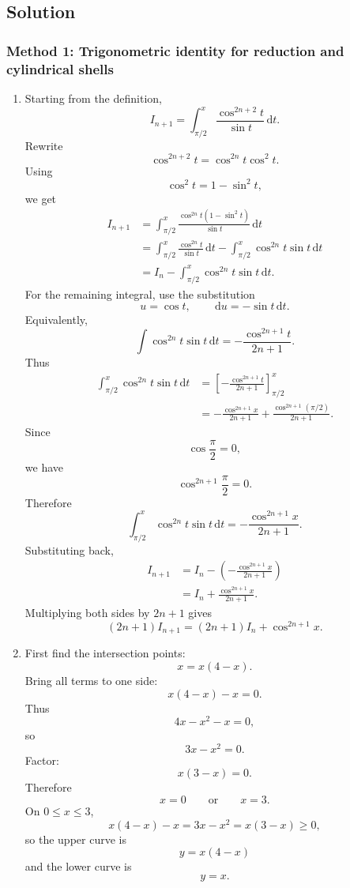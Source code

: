 \documentclass[12pt]{article}
\newcommand{\dd}{\,\mathrm{d}}
\begin{document}
\newpage
\subsection{Solution}

\subsubsection{Method 1: Trigonometric identity for reduction and cylindrical shells}

\begin{enumerate}[label=(\alph*)]
\item Starting from the definition,
\[
I_{n+1}
=
\int_{\pi/2}^x \frac{\cos^{2n+2}t}{\sin t}\dd t.
\]
Rewrite
\[
\cos^{2n+2}t=\cos^{2n}t\cos^2t.
\]
Using
\[
\cos^2t=1-\sin^2t,
\]
we get
\begin{align*}
I_{n+1}
&=
\int_{\pi/2}^x
\frac{\cos^{2n}t(1-\sin^2t)}{\sin t}\dd t\\
&=
\int_{\pi/2}^x
\frac{\cos^{2n}t}{\sin t}\dd t
-
\int_{\pi/2}^x
\cos^{2n}t\sin t\dd t\\
&=
I_n
-
\int_{\pi/2}^x
\cos^{2n}t\sin t\dd t.
\end{align*}
For the remaining integral, use the substitution
\[
u=\cos t,
\qquad
\dd u=-\sin t\dd t.
\]
Equivalently,
\[
\int \cos^{2n}t\sin t\dd t
=
-\frac{\cos^{2n+1}t}{2n+1}.
\]
Thus
\begin{align*}
\int_{\pi/2}^x
\cos^{2n}t\sin t\dd t
&=
\left[-\frac{\cos^{2n+1}t}{2n+1}\right]_{\pi/2}^{x}\\
&=
-\frac{\cos^{2n+1}x}{2n+1}
+
\frac{\cos^{2n+1}(\pi/2)}{2n+1}.
\end{align*}
Since
\[
\cos\frac{\pi}{2}=0,
\]
we have
\[
\cos^{2n+1}\frac{\pi}{2}=0.
\]
Therefore
\[
\int_{\pi/2}^x
\cos^{2n}t\sin t\dd t
=
-\frac{\cos^{2n+1}x}{2n+1}.
\]
Substituting back,
\begin{align*}
I_{n+1}
&=
I_n
-
\left(
-\frac{\cos^{2n+1}x}{2n+1}
\right)\\
&=
I_n+\frac{\cos^{2n+1}x}{2n+1}.
\end{align*}
Multiplying both sides by $2n+1$ gives
\[
\boxed{(2n+1)I_{n+1}=(2n+1)I_n+\cos^{2n+1}x.}
\]

\item First find the intersection points:
\[
x=x(4-x).
\]
Bring all terms to one side:
\[
x(4-x)-x=0.
\]
Thus
\[
4x-x^2-x=0,
\]
so
\[
3x-x^2=0.
\]
Factor:
\[
x(3-x)=0.
\]
Therefore
\[
x=0
\qquad\text{or}\qquad
x=3.
\]
On $0\le x\le3$,
\[
x(4-x)-x=3x-x^2=x(3-x)\ge0,
\]
so the upper curve is
\[
y=x(4-x)
\]
and the lower curve is
\[
y=x.
\]


\end{enumerate}
\end{document}
